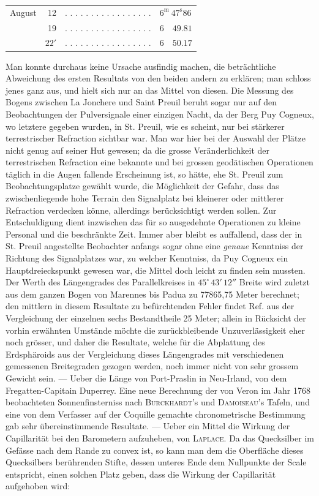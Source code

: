 \begin{center}\small\setlength{\tabcolsep}{3pt}
\begin{tabular}{lrll}
August & 12 & . . . . . . . . . . . . . . . . . & $6^{\mathrm m}\ 47^{\mathrm s}86$ \\
 & 19 & . . . . . . . . . . . . . . . . . & $6\quad49.81$ \\
 & $22'$ & . . . . . . . . . . . . . . . . . & $6\quad50.17$ \\
\end{tabular}\end{center}
\noindent Man konnte durchaus keine Ursache ausfindig machen, die beträchtliche Abweichung des ersten Resultats von den beiden andern zu erklären; man schloss jenes ganz aus, und hielt sich nur an das Mittel von diesen. Die Messung des Bogens zwischen La Jonchere und Saint Preuil beruht sogar nur auf den Beobachtungen der Pulversignale einer einzigen Nacht, da der Berg Puy Cogneux, wo letztere gegeben wurden, in St. Preuil, wie es scheint, nur bei stärkerer terrestrischer Refraction sichtbar war. Man war hier bei der Auswahl der Plätze nicht genug auf seiner Hut gewesen; da die grosse Veränderlichkeit der terrestrischen Refraction eine bekannte und bei grossen geodätischen Operationen täglich in die Augen fallende Erscheinung ist, so hätte, ehe St. Preuil zum Beobachtungsplatze gewählt wurde, die Möglichkeit der Gefahr, dass das zwischenliegende hohe Terrain den Signalplatz bei kleinerer oder mittlerer Refraction verdecken könne, allerdings berücksichtigt werden sollen. Zur Entschuldigung dient inzwischen das für so ausgedehnte Operationen zu kleine Personal und die beschränkte Zeit. Immer aber bleibt es auffallend, dass der in St. Preuil angestellte Beobachter anfangs sogar ohne eine \emph{genaue} Kenntniss der Richtung des Signalplatzes war, zu welcher Kenntniss, da Puy Cogneux ein Hauptdreieckspunkt gewesen war, die Mittel doch leicht zu finden sein mussten. Der Werth des Längengrades des Parallelkreises in $45^\circ\,43'\,12''$ Breite wird zuletzt aus dem ganzen Bogen von Marennes bis Padua zu 77865,75 Meter berechnet; den mittlern in diesem Resultate zu befürchtenden Fehler findet Ref. aus der Vergleichung der einzelnen sechs Bestandtheile 25 Meter; allein in Rücksicht der vorhin erwähnten Umstände möchte die zurückbleibende Unzuverlässigkeit eher noch grösser, und daher die Resultate, welche für die Abplattung des Erdsphäroids aus der Vergleichung dieses Längengrades mit verschiedenen gemessenen Breitegraden gezogen werden, noch immer nicht von sehr grossem Gewicht sein. — Ueber die Länge von Port-Praslin in Neu-Irland, von dem Fregatten-Capitain Duperrey. Eine neue Berechnung der von Veron im Jahr 1768 beobachteten Sonnenfinsterniss nach \textsc{Burckhardt}'s und \textsc{Damoiseau}'s Tafeln, und eine von dem Verfasser auf der Coquille gemachte chronometrische Bestimmung gab sehr übereinstimmende Resultate. — Ueber ein Mittel die Wirkung der Capillarität bei den Barometern aufzuheben, von \textsc{Laplace}. Da das Quecksilber im Gefässe nach dem Rande zu convex ist, so kann man dem die Oberfläche dieses Quecksilbers berührenden Stifte, dessen unteres Ende dem Nullpunkte der Scale entspricht, einen solchen Platz geben, dass die Wirkung der Capillarität aufgehoben wird: 